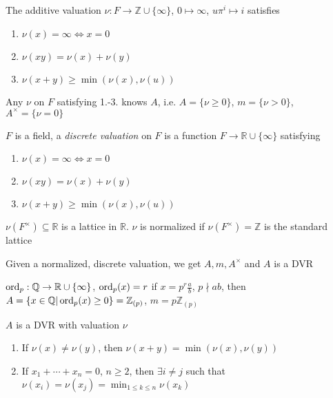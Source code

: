 \documentclass[../main.tex]{subfiles}
\begin{document}
\begin{definition}
The additive valuation $\nu:F\to\mathbb Z\cup\{\infty\}$, $0\mapsto\infty$, $u\pi^i\mapsto i$ satisfies
\begin{enumerate}
\item $\nu(x)=\infty\Leftrightarrow x=0$
\item $\nu(xy)=\nu(x)+\nu(y)$
\item $\nu(x+y)\geq\min(\nu(x),\nu(u))$
\end{enumerate}
Any $\nu$ on $F$ satisfying 1.-3. knows $A$, i.e. $A=\{\nu\geq0\}$, $m=\{\nu>0\}$, $A^\times=\{\nu=0\}$
\end{definition}

\begin{definition}
$F$ is a field, a \textit{discrete valuation} on $F$ is a function $F\to\mathbb R\cup\{\infty\}$ satisfying
\begin{enumerate}
\item $\nu(x)=\infty\Leftrightarrow x=0$
\item $\nu(xy)=\nu(x)+\nu(y)$
\item $\nu(x+y)\geq\min(\nu(x),\nu(u))$
\end{enumerate}
$\nu(F^\times)\subseteq\mathbb R$ is a lattice in $\mathbb R$. $\nu$ is normalized if $\nu(F^\times)=\mathbb Z$ is the standard lattice
\end{definition}

\begin{remark}
Given a normalized, discrete valuation, we get $A,m,A^\times$ and $A$ is a DVR
\end{remark}

\begin{example}
$\operatorname{ord}_p:\mathbb Q\to\mathbb R\cup\{\infty\}$, $\operatorname{ord}_p(x)=r$ if $x=p^r\frac{a}{b}$, $p\nmid ab$, then $A=\{x\in\mathbb Q|\operatorname{ord}_p(x)\geq0\}=\mathbb Z_{(p)}$, $m=p\mathbb Z_{(p)}$
\end{example}

\begin{exercise}
$A$ is a DVR with valuation $\nu$
\begin{enumerate}
\item If $\nu(x)\neq\nu(y)$, then $\nu(x+y)=\min(\nu(x),\nu(y))$
\item If $x_1+\cdots+x_n=0$, $n\geq2$, then $\exists i\neq j$ such that $\nu(x_i)=\nu(x_j)=\min_{1\leq k\leq n}\nu(x_k)$
\end{enumerate}
\end{exercise}
\end{document}
